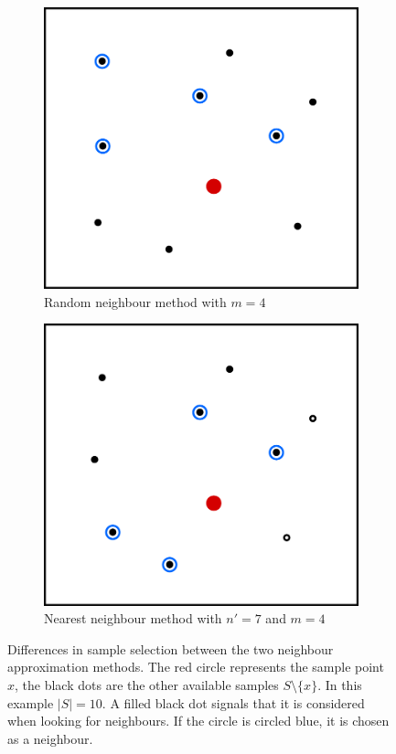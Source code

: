 \documentclass[
  a4paper,  %
  twoside,  %
  bibliography=totoc,
  headsepline,
  cleardoublepage=empty,
  parskip=half,
  draft=false
]{scrbook}
\begin{document}
\begin{figure}
\begin{subfigure}{.5\textwidth}
  \centering
  \includegraphics[width=.8\linewidth]{graphics/as_rn}
  \caption{Random neighbour method with $m=4$}
  \label{fig:as_rn}
\end{subfigure}%
\begin{subfigure}{.5\textwidth}
  \centering
  \includegraphics[width=.8\linewidth]{graphics/as_nn}
  \caption{Nearest neighbour method with $n'=7$ and $m=4$}
  \label{fig:as_nn}
\end{subfigure}
\caption{Differences in sample selection between the two neighbour approximation methods. The red circle represents the sample point $x$, the black dots are the other available samples $S \setminus \{x\}$. In this example $|S|=10$. A filled black dot signals that it is considered when looking for neighbours. If the circle is circled blue, it is chosen as a neighbour.}
\label{fig:as_approx}
\end{figure}
\end{document}
